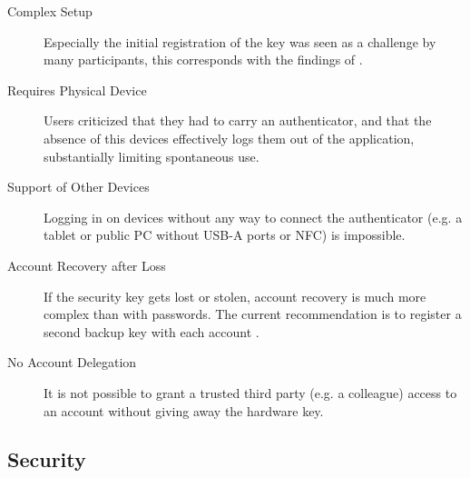 \begin{description}
    \item[Complex Setup] Especially the initial registration of the key was seen as a challenge by many participants, this corresponds with the findings of \cite{das2018}.
    \item[Requires Physical Device] Users criticized that they had to carry an authenticator, and that the absence of this devices effectively logs them out of the application, substantially limiting spontaneous use.
    \item[Support of Other Devices] Logging in on devices without any way to connect the authenticator (e.g. a tablet or public PC without USB-A ports or NFC) is impossible.
    \item[Account Recovery after Loss] If the security key gets lost or stolen, account recovery is much more complex than with passwords. The current recommendation is to register a second backup key with each account \cite{gomi2019}.
    \item[No Account Delegation] It is not possible to grant a trusted third party (e.g. a colleague) access to an account without giving away the hardware key.
\end{description}



\subsection{Security}
\label{subsec:security}

